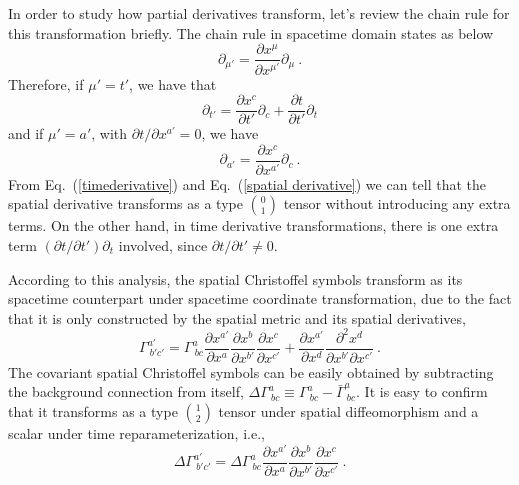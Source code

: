 In order to study how partial derivatives transform, let's review the chain rule for this transformation briefly. The chain rule in spacetime domain states as below
\begin{equation}
\partial_{\mu'} = \frac{\partial x^{\mu}}{\partial x^{\mu'}}\partial_{\mu} \ .
\end{equation}
Therefore, if $\mu' = t'$, we have that
\begin{equation}\label{timederivative}
\partial_{t'} = \frac{\partial x^{c}}{\partial t'}\partial_{c} + \frac{\partial t}{\partial t'}\partial_{t}
\end{equation}
and if $\mu' = a'$, with $\partial t/\partial x^{a'} = 0$, we have
\begin{equation}\label{spatial derivative}
\partial_{a'} = \frac{\partial x^{c}}{\partial x^{a'}}\partial_{c} \ .
\end{equation}
From Eq.~(\ref{timederivative}) and Eq.~(\ref{spatial derivative}) we can tell that the spatial derivative transforms as a type $0 \choose 1$ tensor without introducing any extra terms. On the other hand, in time derivative transformations, there is one extra term $\left(\partial t/\partial t'\right)\partial_{t}$ involved, since $\partial t/\partial t' \ne 0$. 

According to this analysis, the spatial Christoffel symbols transform as its spacetime counterpart under spacetime coordinate transformation, due to the fact that it is only constructed by the spatial metric and its spatial derivatives, 
\begin{equation}
\Gamma^{a'}_{~b'c'} = \Gamma^{a}_{~bc}\frac{\partial x^{a'}}{\partial x^{a}}\frac{\partial x^{b}}{\partial x^{b'}}\frac{\partial x^{c}}{\partial x^{c'}} + \frac{\partial x^{a'}}{\partial x^{d}}\frac{\partial^{2} x^{d}}{\partial x^{b'}\partial x^{c'}} \ .
\end{equation}
The covariant spatial Christoffel symbols can be easily obtained by subtracting the background connection from itself, $\Delta \Gamma^{a}_{~bc} \equiv \Gamma^{a}_{~bc} - {\bar \Gamma}^{a}_{~bc}$. It is easy to confirm that it transforms as a type $1 \choose 2$ tensor under spatial diffeomorphism and a scalar under time reparameterization, i.e.,  
\begin{equation}
	\Delta \Gamma^{a'}_{~b'c'} = \Delta \Gamma^{a}_{~bc}\frac{\partial x^{a'}}{\partial x^{a}}\frac{\partial x^{b}}{\partial x^{b'}}\frac{\partial x^{c}}{\partial x^{c'}} \ .	
\end{equation}

